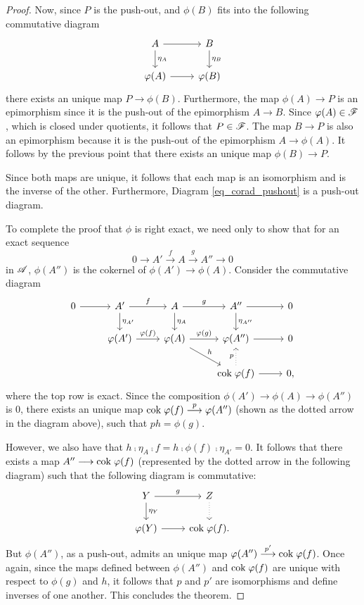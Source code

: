 \begin{proof}
Now, since $P$ is the push-out, and $\phi(B)$ fits into the 
following commutative diagram
\begin{equation}\label{eq_corad_pushout}
\begin{tikzcd}
A \arrow{r} \arrow{d}{\eta_A} & B \arrow{d}{\eta_B} \\
\phi(A) \arrow{r} &\phi(B)
\end{tikzcd}
\end{equation}
there exists an unique map $P \to \phi(B)$. Furthermore, the map 
$\phi(A) \to P$ is an epimorphism since it is the push-out of the 
epimorphism $A \to B$. Since $\varphi(A) \in \mathscr{F}$, which is closed 
under quotients, it follows that $P \in \mathscr{F}$. The map $B \to 
P$ is also an epimorphism because it is the push-out of the 
epimorphism $A \to \phi(A)$. It follows by the previous point that 
there exists an unique map $\phi(B) \to P$.

Since both maps are unique, it follows that each map is an 
isomorphism and is the inverse of the other. Furthermore,
Diagram \eqref{eq_corad_pushout} is a push-out diagram.

To complete the proof that $\phi$ is right exact, we need only to 
show that for an exact sequence 
\[
0 \to A' \stackrel{f}{\to} A \stackrel{g}{\to} A'' \to 0
\] 
in $\mathscr{A}$, $\phi(A'')$ is the cokernel of $\phi(A') \to 
\phi(A)$. Consider the commutative diagram
\[
\begin{tikzcd}
0 \arrow{r} & 
A' \arrow{r}{f} \arrow{d}{\eta_{A'}} &
A \arrow{r}{g} \arrow{d}{\eta_A}&
A'' \arrow{r}\arrow{d}{\eta_{A''}} &
0 \\
& \phi(A') \arrow{r}{\phi(f)} &
\phi(A) \arrow{r}{\phi(g)} \arrow{rd}{h} &
\phi(A'') \arrow{r} &
0 \\
& & & \cok \phi(f) \arrow[dotted]{u}{p} \arrow{r} &0,
\end{tikzcd}
\]
where the top row is exact. Since the composition $\phi(A') \to 
\phi(A) \to \phi(A'')$ is 0, there exists an unique map $\mathrm{cok}\; 
\varphi(f) \stackrel{p}{\longrightarrow} \varphi(A'')$ (shown as the dotted arrow in 
the diagram above), such that $ph = \phi(g)$.

However, we also have that $h \comp \eta_A \comp f = h \comp 
\phi(f) \comp \eta_{A'} = 0$. It follows that there exists a map 
$A'' \longrightarrow \mathrm{cok}\; \varphi(f)$ (represented by the dotted arrow in the 
following diagram) such that the following diagram is commutative:
\[
\begin{tikzcd}
Y \arrow{r}{g}\arrow{d}{\eta_Y} & Z \arrow[dotted]{d} \\
\phi(Y) \arrow{r} &\cok \phi(f).
\end{tikzcd}
\]
But $\phi(A'')$, as a push-out, admits an unique map
$\varphi(A'') \stackrel{p'}{\longrightarrow} \mathrm{cok}\; \varphi(f)$. Once again, since the 
maps defined between $\phi(A'')$ and $\mathrm{cok}\; \varphi(f)$ are unique with
respect to $\phi(g)$ and $h$, it follows that $p$ and $p'$ are 
isomorphisms and define inverses of one another. This concludes 
the theorem.
\end{proof}

